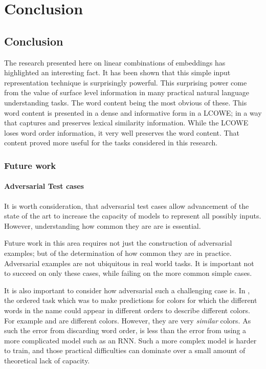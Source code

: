 \documentclass{book}
\begin{document}
\part{Conclusion}
\chapter{Conclusion}
The research presented here on linear combinations of embeddings has highlighted an interesting fact.
It has been shown that this simple input representation technique is surprisingly powerful.
This surprising power come from the value of surface level information in many practical natural language understanding tasks.
The word content being the most obvious of these.
This word content is presented in a dense and informative form in a LCOWE; in a way that captures and preserves lexical similarity information.
While the LCOWE loses word order information, it very well preserves the word content.
That content proved more useful for the tasks considered in this research.

\section{Future work}

\subsection{Adversarial Test cases}
It is worth consideration,
that adversarial test cases allow advancement of the state of the art to increase the capacity of models to represent all possibly inputs.
However, understanding how common they are are is essential.

Future work in this area requires not just the construction of adversarial examples; but of the determination of how common they are in practice.
Adversarial examples are not ubiquitous in real world tasks.
It is important not to succeed on only these cases, while failing on the more common simple cases.

It is also important to consider how adversarial such a challenging case is.
In , the ordered task which was to make predictions for colors for which the different words in the name could appear in different orders to describe different colors.
For example  and  are different colors.
However, they are very \emph{similar} colors.
As such the error from discarding word order, is less than the error from using a more complicated model such as an RNN.
Such a more complex model is harder to train, and those practical difficulties can dominate over a small amount of theoretical lack of capacity.
\end{document}
